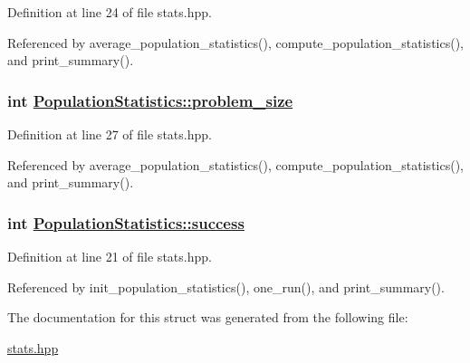 Definition at line 24 of file stats.hpp.

Referenced by average\_\-population\_\-statistics(), compute\_\-population\_\-statistics(), and print\_\-summary().\hypertarget{struct_population_statistics_e1a5a08b7e0915388945ae6a7b435140}{
\subsubsection[problem\_\-size]{\setlength{\rightskip}{0pt plus 5cm}int \hyperlink{struct_population_statistics_e1a5a08b7e0915388945ae6a7b435140}{Population\-Statistics::problem\_\-size}}}
\label{struct_population_statistics_e1a5a08b7e0915388945ae6a7b435140}




Definition at line 27 of file stats.hpp.

Referenced by average\_\-population\_\-statistics(), compute\_\-population\_\-statistics(), and print\_\-summary().\hypertarget{struct_population_statistics_b23768923d2792507a49607eb5ea58ed}{
\subsubsection[success]{\setlength{\rightskip}{0pt plus 5cm}int \hyperlink{struct_population_statistics_b23768923d2792507a49607eb5ea58ed}{Population\-Statistics::success}}}
\label{struct_population_statistics_b23768923d2792507a49607eb5ea58ed}




Definition at line 21 of file stats.hpp.

Referenced by init\_\-population\_\-statistics(), one\_\-run(), and print\_\-summary().

The documentation for this struct was generated from the following file:\begin{CompactItemize}
\item 
\hyperlink{stats_8hpp}{stats.hpp}\end{CompactItemize}
